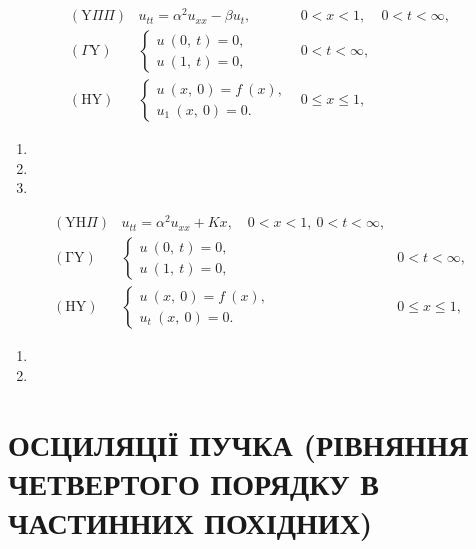 \documentclass[
  ukrainian,
]{article}
\providecommand{\tightlist}{%
  \setlength{\itemsep}{0pt}\setlength{\parskip}{0pt}}
\begin{document}
\[
\begin{array}{lll} (\mathrm{Y} \Pi \Pi) & u_{tt} = \alpha^2 u_{xx} - \beta u_t, & 0 < x < 1, & 0 < t < \infty, \\ (\Gamma \mathrm{Y}) & \begin{cases} u \ (0, \ t) = 0, \\ u \ (1, \ t) = 0, \end{cases} & 0 < t < \infty, \\ (\mathrm{H} \mathrm{Y}) & \begin{cases} u \ (x, \ 0) = f \ (x), \\ u_1 \ (x, \ 0) = 0. \end{cases} & 0 \leqslant x \leqslant 1, \end{array}
\]

\begin{enumerate}
\def\labelenumi{\arabic{enumi}.}
\setcounter{enumi}{16}
\tightlist
\item
\item
\item
\end{enumerate}

\[
\begin{array}{ll} (\mathrm{Y} \mathrm{H} \Pi) & u_{tt} = \alpha^2 u_{xx} + Kx, \quad 0 < x < 1, \ 0 < t < \infty, \\ (\mathrm{\Gamma} \mathrm{Y}) & \begin{cases} u \ (0, \ t) = 0, \\ u \ (1, \ t) = 0, \end{cases} & 0 < t < \infty, \\ (\mathrm{H} \mathrm{Y}) & \begin{cases} u \ (x, \ 0) = f \ (x), \\ u_t \ (x, \ 0) = 0. \end{cases} & 0 \leqslant x \leqslant 1, \end{array}
\]

\begin{enumerate}
\def\labelenumi{\arabic{enumi}.}
\setcounter{enumi}{18}
\tightlist
\item
\item
\end{enumerate}

\section{ОСЦИЛЯЦІЇ ПУЧКА (РІВНЯННЯ ЧЕТВЕРТОГО ПОРЯДКУ В ЧАСТИННИХ
ПОХІДНИХ)}\label{ux43eux441ux446ux438ux43bux44fux446ux456ux457-ux43fux443ux447ux43aux430-ux440ux456ux432ux43dux44fux43dux43dux44f-ux447ux435ux442ux432ux435ux440ux442ux43eux433ux43e-ux43fux43eux440ux44fux434ux43aux443-ux432-ux447ux430ux441ux442ux438ux43dux43dux438ux445-ux43fux43eux445ux456ux434ux43dux438ux445}
\end{document}
